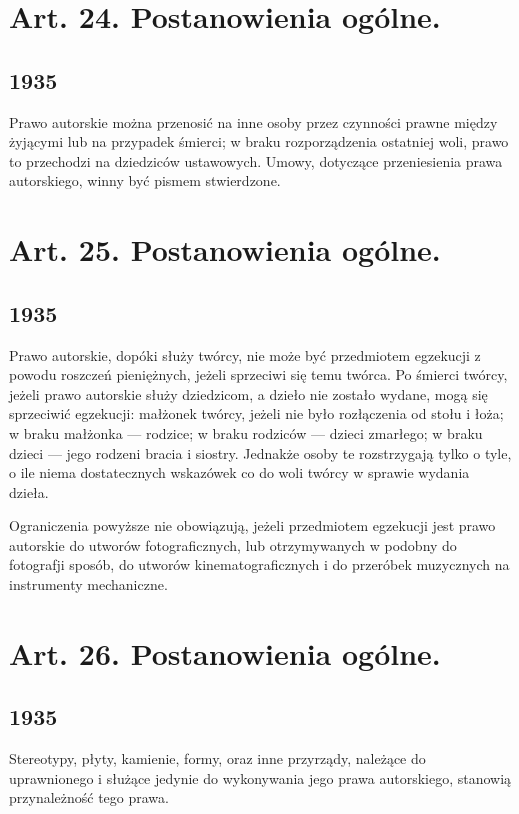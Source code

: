 \documentclass[withmarginpar]{book}
\begin{document}
\section{Art. 24. Postanowienia ogólne.}
\label{sec:art.-24}
\subsection{1935}
\label{sec:art.-24-1}

Prawo autorskie można przenosić na inne osoby przez czynności prawne
między żyjącymi lub na przypadek śmierci; w braku rozporządzenia
ostatniej woli, prawo to przechodzi na dziedziców ustawowych. Umowy,
dotyczące przeniesienia prawa autorskiego, winny być pismem
stwierdzone.

\section{Art. 25. Postanowienia ogólne.}
\label{sec:art.-25}
\subsection{1935}
\label{sec:art.-25-1}

Prawo autorskie, dopóki służy twórcy, nie może być przedmiotem
egzekucji z powodu roszczeń pieniężnych, jeżeli sprzeciwi się temu
twórca. Po śmierci twórcy, jeżeli prawo autorskie służy dziedzicom, a
dzieło nie zostało wydane, mogą się sprzeciwić egzekucji: małżonek
twórcy, jeżeli nie było rozłączenia od stołu i łoża; w braku małżonka
— rodzice; w braku rodziców — dzieci zmarłego; w braku dzieci — jego
rodzeni bracia i siostry. Jednakże osoby te rozstrzygają tylko o tyle,
o ile niema dostatecznych wskazówek co do woli twórcy w sprawie
wydania dzieła.

Ograniczenia powyższe nie obowiązują, jeżeli przedmiotem egzekucji
jest prawo autorskie do utworów fotograficznych, lub otrzymywanych w
podobny do fotografji sposób, do utworów kinematograficznych i do
przeróbek muzycznych na instrumenty mechaniczne.

\section{Art. 26. Postanowienia ogólne.}
\label{sec:art.-26}
\subsection{1935}
\label{sec:art.-26-1}

Stereotypy, płyty, kamienie, formy, oraz inne przyrządy, należące do
uprawnionego i służące jedynie do wykonywania jego prawa autorskiego,
stanowią przynależność tego prawa.
\end{document}
